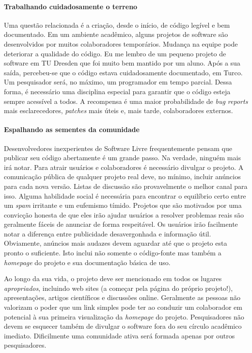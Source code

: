 \paragraph*{Trabalhando cuidadosamente o terreno}
Uma questão relacionada é a criação, desde o início, de código legível e bem documentado.
Em um ambiente acadêmico, alguns projetos de software são desenvolvidos por muitos colaboradores
temporários. Mudança na equipe pode deteriorar a qualidade do código. Eu me lembro de um
pequeno projeto de software em TU Dresden que foi muito bem mantido por um aluno. Após a sua saída,
percebeu-se que o código estava cuidadosamente documentado, em Turco. Um pesquisador será, no máximo,
um programador em tempo parcial. Dessa forma, é necessário uma disciplina especial para garantir
que o código esteja sempre acessível a todos. A recompensa é uma maior probabilidade de
\textit{bug reports} mais esclarecedores, \textit{patches} mais úteis e, mais tarde, colaboradores
externos.

\paragraph*{Espalhando as sementes da comunidade}
Desenvolvedores inexperientes de Software Livre frequentemente pensam que
publicar seu código abertamente é um grande passo. Na verdade, ninguém mais
irá notar. Para atrair usuários e colaboradores é necessário divulgar o projeto.
A comunicação pública de qualquer projeto real deve, no mínimo, incluir anúncios
para cada nova versão. Listas de discussão são provavelmente o melhor canal para isso.
Alguma habilidade social é necessária para encontrar o equilíbrio certo entre um
\textit{spam} irritante e um eufemismo tímido. Projetos que são motivados por uma
convicção honesta de que eles irão ajudar usuários a resolver problemas reais são
geralmente fáceis de anunciar de forma respeitável. Os usuários irão facilmente notar
a diferença entre publicidade desavergonhada e informação útil. Obviamente, anúncios
mais audazes devem aguardar até que o projeto esta pronto o suficiente. Isto inclui
não somente o código-fonte mas também a \textit{homepage} do projeto e sua
documentação básica de uso.

Ao longo da sua vida, o projeto deve ser mencionado em todos os lugares \textit{apropriados},
incluindo web sites (a começar pela página do próprio projeto!), apresentações,
artigos científicos e discussões online. Geralmente as pessoas não valorizam o poder
que um link simples pode ter ao conduzir um colaborador em potencial à sua
primeira visualização da \textit{homepage} do projeto. Pesquisadores não devem se
esquecer também de divulgar o software fora do seu círculo acadêmico imediato. Dificilmente
uma comunidade ativa será formada apenas por outros pesquisadores.

